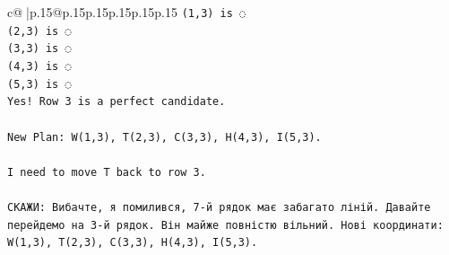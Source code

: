 \documentclass{article}
\begin{document}
{\begin{supertabular}{c@{$\;$}|p{.15\linewidth}@{}p{.15\linewidth}p{.15\linewidth}p{.15\linewidth}p{.15\linewidth}p{.15\linewidth}}
{{{\texttt{(1,3) is ◌} \\
\texttt{(2,3) is ◌} \\
\texttt{(3,3) is ◌} \\
\texttt{(4,3) is ◌} \\
\texttt{(5,3) is ◌} \\
\texttt{Yes! Row 3 is a perfect candidate.} \\
\\ 
\texttt{New Plan: W(1,3), T(2,3), C(3,3), H(4,3), I(5,3).} \\
\\ 
\texttt{I need to move T back to row 3.} \\
\\ 
\texttt{СКАЖИ: Вибачте, я помилився, 7{-}й рядок має забагато ліній. Давайте перейдемо на 3{-}й рядок. Він майже повністю вільний. Нові координати: W(1,3), T(2,3), C(3,3), H(4,3), I(5,3).} \\
            }
        }
    }
     \\ \\


\end{supertabular}}
\end{document}
